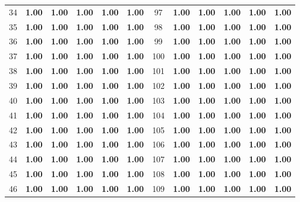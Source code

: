 \documentclass{article}
\begin{document}
{\begin{longtable}{cccccc@{\qquad}cccccc}
34 & \textbf{1.00} & \textbf{1.00} & \textbf{1.00} & \textbf{1.00} & \textbf{1.00} & 97 & \textbf{1.00} & \textbf{1.00} & \textbf{1.00} & \textbf{1.00} & \textbf{1.00} \\
35 & \textbf{1.00} & \textbf{1.00} & \textbf{1.00} & \textbf{1.00} & \textbf{1.00} & 98 & \textbf{1.00} & \textbf{1.00} & \textbf{1.00} & \textbf{1.00} & \textbf{1.00} \\
36 & \textbf{1.00} & \textbf{1.00} & \textbf{1.00} & \textbf{1.00} & \textbf{1.00} & 99 & \textbf{1.00} & \textbf{1.00} & \textbf{1.00} & \textbf{1.00} & \textbf{1.00} \\
37 & \textbf{1.00} & \textbf{1.00} & \textbf{1.00} & \textbf{1.00} & \textbf{1.00} & 100 & \textbf{1.00} & \textbf{1.00} & \textbf{1.00} & \textbf{1.00} & \textbf{1.00} \\
38 & \textbf{1.00} & \textbf{1.00} & \textbf{1.00} & \textbf{1.00} & \textbf{1.00} & 101 & \textbf{1.00} & \textbf{1.00} & \textbf{1.00} & \textbf{1.00} & \textbf{1.00} \\
39 & \textbf{1.00} & \textbf{1.00} & \textbf{1.00} & \textbf{1.00} & \textbf{1.00} & 102 & \textbf{1.00} & \textbf{1.00} & \textbf{1.00} & \textbf{1.00} & \textbf{1.00} \\
40 & \textbf{1.00} & \textbf{1.00} & \textbf{1.00} & \textbf{1.00} & \textbf{1.00} & 103 & \textbf{1.00} & \textbf{1.00} & \textbf{1.00} & \textbf{1.00} & \textbf{1.00} \\
41 & \textbf{1.00} & \textbf{1.00} & \textbf{1.00} & \textbf{1.00} & \textbf{1.00} & 104 & \textbf{1.00} & \textbf{1.00} & \textbf{1.00} & \textbf{1.00} & \textbf{1.00} \\
42 & \textbf{1.00} & \textbf{1.00} & \textbf{1.00} & \textbf{1.00} & \textbf{1.00} & 105 & \textbf{1.00} & \textbf{1.00} & \textbf{1.00} & \textbf{1.00} & \textbf{1.00} \\
43 & \textbf{1.00} & \textbf{1.00} & \textbf{1.00} & \textbf{1.00} & \textbf{1.00} & 106 & \textbf{1.00} & \textbf{1.00} & \textbf{1.00} & \textbf{1.00} & \textbf{1.00} \\
44 & \textbf{1.00} & \textbf{1.00} & \textbf{1.00} & \textbf{1.00} & \textbf{1.00} & 107 & \textbf{1.00} & \textbf{1.00} & \textbf{1.00} & \textbf{1.00} & \textbf{1.00} \\
45 & \textbf{1.00} & \textbf{1.00} & \textbf{1.00} & \textbf{1.00} & \textbf{1.00} & 108 & \textbf{1.00} & \textbf{1.00} & \textbf{1.00} & \textbf{1.00} & \textbf{1.00} \\
46 & \textbf{1.00} & \textbf{1.00} & \textbf{1.00} & \textbf{1.00} & \textbf{1.00} & 109 & \textbf{1.00} & \textbf{1.00} & \textbf{1.00} & \textbf{1.00} & \textbf{1.00} \\

\end{longtable}}
\end{document}
